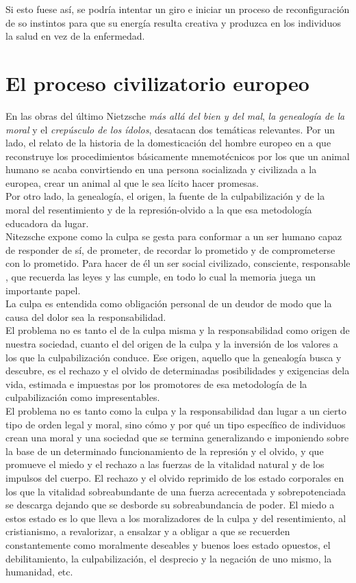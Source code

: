 \documentclass[a4paper, 10pt, twocolumn, spanish]{article}
\begin{document}
Si esto fuese así, se podría intentar un giro e iniciar un proceso de
reconfiguración de so instintos para que su energía resulta creativa y
produzca en los individuos la salud en vez de la enfermedad.


\section{El proceso civilizatorio europeo}
\label{sec:org5cfd9f7}
En las obras del último Nietzsche \emph{más allá del bien y del mal}, \emph{la
genealogía de la moral} y el \emph{crepúsculo de los ídolos}, desatacan dos
temáticas relevantes. Por un lado, el relato de la historia de la
domesticación del hombre europeo en a que reconstruye los
procedimientos básicamente mnemotécnicos por los que un animal humano
se acaba convirtiendo en una persona socializada y civilizada a la
europea, crear un animal al que le sea lícito hacer promesas.\\[0pt]
Por otro lado, la genealogía, el origen, la fuente de la
culpabilización y de la moral del resentimiento y de la
represión-olvido a la que esa metodología educadora da lugar.\\[0pt]

Nitezsche expone como la culpa se gesta para conformar a un ser humano
capaz de responder de sí, de prometer, de recordar lo prometido y de
comprometerse con lo prometido. Para hacer de él un ser social
civilizado, consciente, responsable , que recuerda las leyes y las
cumple, en todo lo cual la memoria juega un importante papel.\\[0pt]
La culpa es entendida como obligación personal de un deudor de modo
que la causa del dolor sea la responsabilidad.\\[0pt]

El problema no es tanto el de la culpa misma y la responsabilidad como
origen de nuestra sociedad, cuanto el del origen de la culpa y la
inversión de los valores a los que la culpabilización conduce. Ese
origen, aquello que la genealogía busca y descubre, es el rechazo y el
olvido de determinadas posibilidades y exigencias dela vida, estimada
e impuestas por los promotores de esa metodología de la
culpabilización como impresentables.\\[0pt]
El problema no es tanto como la culpa y la responsabilidad dan lugar a
un cierto tipo de orden legal y moral, sino cómo y por qué un tipo
específico de individuos crean una moral y una sociedad que se termina
generalizando e imponiendo sobre la base de un determinado
funcionamiento de la represión y el olvido, y que promueve el miedo y
el rechazo a las fuerzas de la vitalidad natural y de los impulsos del
cuerpo. El rechazo y el olvido reprimido de los estado corporales en
los que la vitalidad sobreabundante de una fuerza acrecentada y
sobrepotenciada se descarga dejando que se desborde su sobreabundancia
de poder. El miedo a estos estado es lo que lleva a los moralizadores
de la culpa y del resentimiento, al cristianismo, a revalorizar, a
ensalzar y a obligar a que se recuerden constantemente como moralmente
deseables y buenos loes estado opuestos, el debilitamiento, la
culpabilización, el desprecio y la negación de uno mismo, la
humanidad, etc.\\[0pt]
\end{document}
